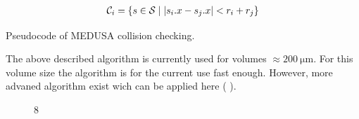 \begin{align}
\begin{split}
\mathcal{C}_i = \{ s \in \mathcal{S} \mid \lvert s_i.x - s_j.x\rvert < r_i+r_j \}
\end{split}
\end{align}
%
\begin{lstfloat}[!t]
	
	\caption{Pseudocode of \acs{MEDUSA} collision checking.}
	\label{alg:medusa_collision}
\end{lstfloat}
%
The above described algorithm is currently used for volumes $\approx \SI{200}{\micro\meter}$. For this volume size the algorithm is for the current use fast enough. However, more advaned algorithm exist wich can be applied here (\eg{}  \cite{Karras2012}).
%
\begin{figure}[!t]
    \centering
	\caption{8 \cite{Ginsburger2019}}
	\label{fig:medusa_8}
\end{figure}
%
